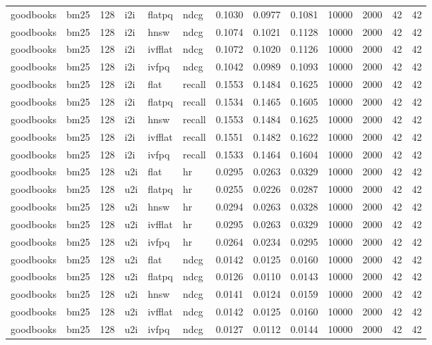 \begin{tabular}{llrlllrrrrrrr}
goodbooks & bm25 & 128 & i2i & flatpq & ndcg & 0.1030 & 0.0977 & 0.1081 & 10000 & 2000 & 42 & 42 \\
goodbooks & bm25 & 128 & i2i & hnsw & ndcg & 0.1074 & 0.1021 & 0.1128 & 10000 & 2000 & 42 & 42 \\
goodbooks & bm25 & 128 & i2i & ivfflat & ndcg & 0.1072 & 0.1020 & 0.1126 & 10000 & 2000 & 42 & 42 \\
goodbooks & bm25 & 128 & i2i & ivfpq & ndcg & 0.1042 & 0.0989 & 0.1093 & 10000 & 2000 & 42 & 42 \\
goodbooks & bm25 & 128 & i2i & flat & recall & 0.1553 & 0.1484 & 0.1625 & 10000 & 2000 & 42 & 42 \\
goodbooks & bm25 & 128 & i2i & flatpq & recall & 0.1534 & 0.1465 & 0.1605 & 10000 & 2000 & 42 & 42 \\
goodbooks & bm25 & 128 & i2i & hnsw & recall & 0.1553 & 0.1484 & 0.1625 & 10000 & 2000 & 42 & 42 \\
goodbooks & bm25 & 128 & i2i & ivfflat & recall & 0.1551 & 0.1482 & 0.1622 & 10000 & 2000 & 42 & 42 \\
goodbooks & bm25 & 128 & i2i & ivfpq & recall & 0.1533 & 0.1464 & 0.1604 & 10000 & 2000 & 42 & 42 \\
goodbooks & bm25 & 128 & u2i & flat & hr & 0.0295 & 0.0263 & 0.0329 & 10000 & 2000 & 42 & 42 \\
goodbooks & bm25 & 128 & u2i & flatpq & hr & 0.0255 & 0.0226 & 0.0287 & 10000 & 2000 & 42 & 42 \\
goodbooks & bm25 & 128 & u2i & hnsw & hr & 0.0294 & 0.0263 & 0.0328 & 10000 & 2000 & 42 & 42 \\
goodbooks & bm25 & 128 & u2i & ivfflat & hr & 0.0295 & 0.0263 & 0.0329 & 10000 & 2000 & 42 & 42 \\
goodbooks & bm25 & 128 & u2i & ivfpq & hr & 0.0264 & 0.0234 & 0.0295 & 10000 & 2000 & 42 & 42 \\
goodbooks & bm25 & 128 & u2i & flat & ndcg & 0.0142 & 0.0125 & 0.0160 & 10000 & 2000 & 42 & 42 \\
goodbooks & bm25 & 128 & u2i & flatpq & ndcg & 0.0126 & 0.0110 & 0.0143 & 10000 & 2000 & 42 & 42 \\
goodbooks & bm25 & 128 & u2i & hnsw & ndcg & 0.0141 & 0.0124 & 0.0159 & 10000 & 2000 & 42 & 42 \\
goodbooks & bm25 & 128 & u2i & ivfflat & ndcg & 0.0142 & 0.0125 & 0.0160 & 10000 & 2000 & 42 & 42 \\
goodbooks & bm25 & 128 & u2i & ivfpq & ndcg & 0.0127 & 0.0112 & 0.0144 & 10000 & 2000 & 42 & 42 \\

\end{tabular}
